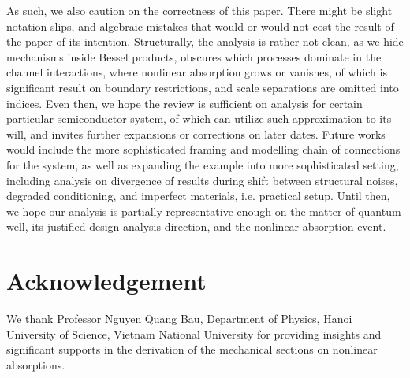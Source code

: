 \documentclass[%
 reprint,
 amsmath,amssymb,
 aps,
]{revtex4-2}
\begin{document}
As such, we also caution on the correctness of this paper. There might be slight notation slips, and algebraic mistakes that would or would not cost the result of the paper of its intention. Structurally, the analysis is rather not clean, as we hide mechanisms inside Bessel products, obscures which processes dominate in the channel interactions, where nonlinear absorption grows or vanishes, of which is significant result on boundary restrictions, and scale separations are omitted into indices. Even then, we hope the review is sufficient on analysis for certain particular semiconductor system, of which can utilize such approximation to its will, and invites further expansions or corrections on later dates. Future works would include the more sophisticated framing and modelling chain of connections for the system, as well as expanding the example into more sophisticated setting, including analysis on divergence of results during shift between structural noises, degraded conditioning, and imperfect materials, i.e. practical setup. Until then, we hope our analysis is partially representative enough on the matter of quantum well, its justified design analysis direction, and the nonlinear absorption event. 

\section{Acknowledgement}

We thank Professor Nguyen Quang Bau, Department of Physics, Hanoi University of Science, Vietnam National University for providing insights and significant supports in the derivation of the mechanical sections on nonlinear absorptions. 


\end{document}
